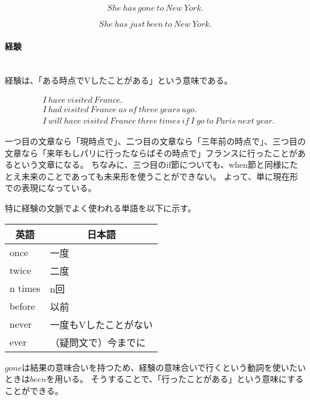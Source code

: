 \begin{equation}
  She ~ has ~ gone ~ to ~ New ~ York \text{.}
\end{equation}

\begin{equation}
  She ~ has ~ just ~ been ~ to ~ New ~ York \text{.}
\end{equation}

\paragraph{経験}\quad\\

経験は、「ある時点でVしたことがある」という意味である。

\begin{align}
  &I ~ have ~ visited ~ France \text{.}\\
  &I ~ had ~ visited ~ France ~ as ~ of ~ three ~ years ~ ago \text{.}\\
  &I ~ will ~ have ~ visited ~ France ~ three ~ times ~ if ~ I ~ go ~ to ~ Paris ~ next ~ year \text{.}
\end{align}

一つ目の文章なら「現時点で」、二つ目の文章なら「三年前の時点で」、三つ目の文章なら「来年もしパリに行ったならばその時点で」フランスに行ったことがあるという文章になる。
ちなみに、三つ目のif節についても、when節と同様にたとえ未来のことであっても未来形を使うことができない。
よって、単に現在形での表現になっている。

特に経験の文脈でよく使われる単語を以下に示す。

\begin{table}[H]
  \centering
  \begin{tabular}{ll}
    \hline
    \multicolumn{1}{c}{英語} & \multicolumn{1}{c}{日本語}\\
    \hline \hline
    once & 一度 \\
    twice & 二度 \\
    n times & n回 \\
    before & 以前 \\
    never & 一度もVしたことがない\\
    ever & （疑問文で）今までに\\
    \hline
  \end{tabular}
\end{table}

$gone$は結果の意味合いを持つため、経験の意味合いで行くという動詞を使いたいときは$been$を用いる。
そうすることで、「行ったことがある」という意味にすることができる。

